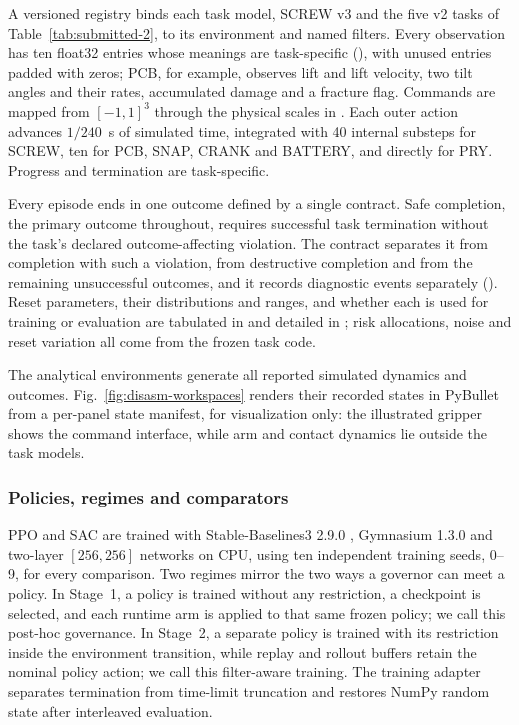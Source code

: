 \documentclass[12pt]{article}
\begin{document}
A versioned registry binds each task model, SCREW v3 and the five v2 tasks of
Table~\ref{tab:submitted-2}, to its environment and named filters. Every
observation has ten float32 entries whose meanings are task-specific
(), with
unused entries padded with zeros; PCB, for example, observes lift and lift
velocity, two tilt angles and their rates, accumulated damage and a fracture
flag. Commands are mapped from $[-1,1]^3$ through the physical scales in
. Each outer action advances $1/240$~s of simulated time,
integrated with 40 internal substeps for SCREW, ten for PCB, SNAP, CRANK and
BATTERY, and directly for PRY. Progress and termination are task-specific.

Every episode ends in one outcome defined by a single contract. Safe
completion, the primary outcome throughout, requires successful task
termination without the task's declared outcome-affecting violation. The
contract separates it from completion with such a violation, from destructive
completion and from the remaining unsuccessful outcomes, and it records
diagnostic events separately (). Reset parameters, their distributions and
ranges, and whether each is used for training or evaluation are tabulated in
 and detailed in ; risk
allocations, noise and reset variation all come from the frozen task code.

The analytical environments generate all reported simulated dynamics and outcomes.
Fig.~\ref{fig:disasm-workspaces} renders their recorded states in PyBullet
\cite{ref33} from a per-panel state manifest, for visualization only: the
illustrated gripper shows the command interface, while arm and contact
dynamics lie outside the task models.

\subsubsection{Policies, regimes and comparators}
\label{sec:training-methods}
PPO and SAC are trained with Stable-Baselines3 2.9.0 \cite{ref45}, Gymnasium
1.3.0 and two-layer $[256,256]$ networks on CPU, using ten independent training
seeds, 0--9, for every comparison. Two regimes mirror the two ways a governor
can meet a policy. In Stage~1, a policy is trained without any restriction, a
checkpoint is selected, and each runtime arm is applied to that same frozen
policy; we call this post-hoc governance. In Stage~2, a separate policy is
trained with its restriction inside the environment transition, while replay
and rollout buffers retain the nominal policy action; we call this
filter-aware training. The training adapter separates termination from
time-limit truncation and restores NumPy random state after interleaved
evaluation.
\end{document}
